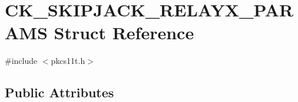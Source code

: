 \hypertarget{struct_c_k___s_k_i_p_j_a_c_k___r_e_l_a_y_x___p_a_r_a_m_s}{}\section{C\+K\+\_\+\+S\+K\+I\+P\+J\+A\+C\+K\+\_\+\+R\+E\+L\+A\+Y\+X\+\_\+\+P\+A\+R\+A\+MS Struct Reference}
\label{struct_c_k___s_k_i_p_j_a_c_k___r_e_l_a_y_x___p_a_r_a_m_s}


{\ttfamily \#include $<$pkcs11t.\+h$>$}

\subsection*{Public Attributes}
